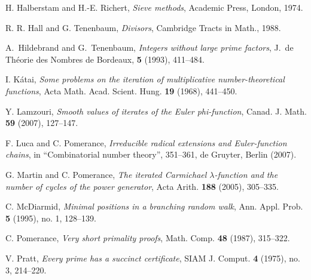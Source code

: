 \documentclass[12pt]{amsart}
\theoremstyle{remark}
\theoremstyle{plain}
\numberwithin{equation}{section}
\renewcommand{\(}{\left(}
\renewcommand{\)}{\right)}
\begin{document}
\begin{thebibliography}{BFLSP}
 H. Halberstam and H.-E. Richert, {\it Sieve methods\/},
Academic Press, London, 1974.

 R. R. Hall and G. Tenenbaum, {\it Divisors},
Cambridge Tracts in Math., 1988.

 A.~Hildebrand and G.~Tenenbaum,
{\it Integers without large prime factors},
J.\ de Th{\'e}orie des Nombres de Bordeaux,
{\bf 5} (1993), 411--484.

 I. K\'atai, {\it Some problems on the iteration of multiplicative
number-theoretical functions}, Acta Math. Acad. Scient. Hung. {\bf
  19} (1968), 441--450.

 Y. Lamzouri, {\it Smooth values of iterates of the Euler
phi-function}, Canad. J. Math. {\bf 59} (2007), 127--147.

 F. Luca and C. Pomerance, {\it Irreducible radical
  extensions and Euler-function chains}, in ``Combinatorial number
  theory'', 351--361, de Gruyter, Berlin (2007).

 G. Martin and C. Pomerance, {\it The iterated Carmichael
  $\lambda$-function and the number of cycles of the power generator},
  Acta Arith. {\bf 188} (2005), 305--335.

 C. McDiarmid, {\it Minimal positions in a branching
  random walk}, Ann. Appl. Prob. {\bf 5} (1995), no. 1, 128--139.

  C. Pomerance, {\it Very short primality proofs},
Math. Comp. {\bf 48} (1987), 315--322.

 V. Pratt, {\it Every prime has a succinct certificate},
SIAM J. Comput. {\bf 4} (1975), no. 3, 214--220.


\end{thebibliography}
\end{document}
